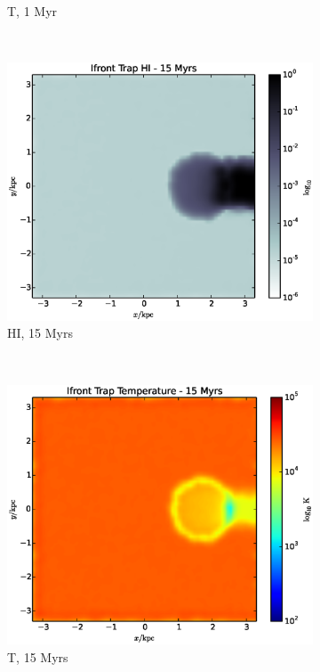 \begin{figure}
\begin{subfigure}[b]{0.45\textwidth}
                \caption{T, 1 Myr}
                \label{fig:ifronttrap1b}
        \end{subfigure}
        \\
        \begin{subfigure}[b]{0.45\textwidth}
                \includegraphics[width=\textwidth]{graphics/ifrontTrap00150HI.eps}
                \caption{HI, 15 Myrs}
                \label{fig:ifronttrap15a}
        \end{subfigure}
        ~ 
        \begin{subfigure}[b]{0.45\textwidth}
                \includegraphics[width=\textwidth]{graphics/ifrontTrap00150Temp.eps}
                \caption{T, 15 Myrs}
                \label{fig:ifronttrap15b}
        \end{subfigure}
        \caption[Ionization front trapping.]{}
        \label{fig:ifronttrap}
\end{figure}

